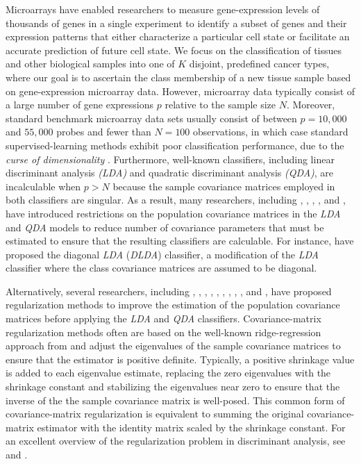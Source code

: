 \documentclass[11pt]{article}
\begin{document}
Microarrays have enabled researchers to measure gene-expression levels of thousands of genes in a single experiment to identify a subset of genes and their expression patterns that either characterize a particular cell state or facilitate an accurate prediction of future cell state.  We focus on the classification of tissues and other biological samples into one of $K$ disjoint, predefined cancer types, where our goal is to ascertain the class membership of a new tissue sample based on gene-expression microarray data. However, microarray data typically consist of a large number of gene expressions $p$ relative to the sample size $N$. Moreover, standard benchmark microarray data sets usually consist of between $p = 10,000$ and $55,000$ probes and fewer than $N = 100$ observations, in which case standard supervised-learning methods exhibit poor classification performance, due to the \emph{curse of dimensionality} \citep{Bellman:1961tn}. Furthermore, well-known classifiers, including linear discriminant analysis \emph{(LDA)} and quadratic discriminant analysis \emph{(QDA)}, are incalculable when $p > N$ because the sample covariance matrices employed in both classifiers are singular. As a result, many researchers, including \cite*{Merchante:2012vk}, \cite{Witten:2011kc}, \cite*{Pang:2009ik}, \cite*{Huang:2010ju}, and \cite*{Clemmensen:2011kr}, have introduced restrictions on the population covariance matrices in the \emph{LDA} and \emph{QDA} models to reduce number of covariance parameters that must be estimated to ensure that the resulting classifiers are calculable.  For instance, \cite{Dudoit:2002ev} have proposed the diagonal \emph{LDA} (\emph{DLDA}) classifier, a modification of the \emph{LDA} classifier where the class covariance matrices are assumed to be diagonal.

Alternatively, several researchers, including \cite*{Zhang:2010va}, \cite{Ye:2009gd}, \cite{Ji:2008wp}, \cite*{Guo:2007te}, \cite{Srivastava:2007ud}, \cite{Ye:2006vx}, \cite*{Thomaz:2006ef}, \cite{Ye:2005uu}, \cite{Mkhadri:1995jp}, and \cite{Peck:1982tt}, have proposed regularization methods to improve the estimation of the population covariance matrices before applying the \emph{LDA} and \emph{QDA} classifiers. Covariance-matrix regularization methods often are based on the well-known ridge-regression approach from \cite{Hoerl:1970cd} and adjust the eigenvalues of the sample covariance matrices to ensure that the estimator is positive definite. Typically, a positive shrinkage value is added to each eigenvalue estimate, replacing the zero eigenvalues with the shrinkage constant and stabilizing the eigenvalues near zero to ensure that the inverse of the the sample covariance matrix is well-posed. This common form of covariance-matrix regularization is equivalent to summing the original covariance-matrix estimator with the identity matrix scaled by the shrinkage constant. For an excellent overview of the regularization problem in discriminant analysis, see \cite{Murphy:2012uq} and \cite{Mkhadri:1997gy}.
\end{document}

